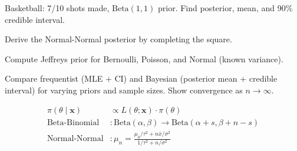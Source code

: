\begin{exercise}[$\star$]
Basketball: 7/10 shots made, $\mathrm{Beta}(1,1)$ prior. Find posterior, mean, and 90\% credible interval.
\end{exercise}

\begin{exercise}[$\star\star$]
Derive the Normal-Normal posterior by completing the square.
\end{exercise}

\begin{exercise}[$\star\star$]
Compute Jeffreys prior for Bernoulli, Poisson, and Normal (known variance).
\end{exercise}

\begin{exercise}
Compare frequentist (MLE + CI) and Bayesian (posterior mean + credible interval) for varying priors and sample sizes. Show convergence as $n\to\infty$.
\end{exercise}

\begin{keyformulas}
\begin{align*}
\pi(\theta\mid\mathbf{x}) &\propto L(\theta;\mathbf{x})\cdot\pi(\theta) \\
\text{Beta-Binomial} &: \mathrm{Beta}(\alpha,\beta)\to\mathrm{Beta}(\alpha+s,\beta+n-s) \\
\text{Normal-Normal} &: \mu_n=\frac{\mu_0/\tau^2+n\bar{x}/\sigma^2}{1/\tau^2+n/\sigma^2}
\end{align*}
\end{keyformulas}
